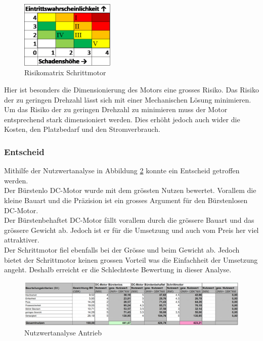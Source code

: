 \documentclass[../../main.tex]{subfiles}
\begin{document}
    \begin{figure}[H]
        \centering
        \includegraphics[width=0.4\textwidth]{Antr_Risiko_Schrittmotor.png}
        \caption {Risikomatrix Schrittmotor}
        \label{fig:antr_risikomatrix_schrittmotor}
    \end{figure}

    Hier ist besonders die Dimensionierung des Motors eine grosses Risiko. Das Risiko der zu geringen Drehzahl lässt sich mit einer Mechanischen Lösung  minimieren. Um das Risiko der zu geringen Drehzahl zu minimieren muss der Motor entsprechend stark dimensioniert werden. Dies erhöht jedoch auch wider die Kosten, den Platzbedarf und den Stromverbrauch.

    \subsubsection{Entscheid}
    Mithilfe der Nutzwertanalyse in Abbildung \ref{fig:antr_nutzwertanalyse} konnte ein Entscheid getroffen werden.\\
    Der Bürstenlo DC-Motor wurde mit dem grössten Nutzen bewertet. Vorallem die kleine Bauart und die Präzision ist ein grosses Argument für den Bürstenlosen DC-Motor.\\
    Der Bürstenbehaftet DC-Motor fällt vorallem durch die grössere Bauart und das grössere Gewicht ab. Jedoch ist er für die Umsetzung und auch vom Preis her viel attraktiver.\\
    Der Schrittmotor fiel ebenfalls bei der Grösse und beim Gewicht ab. Jedoch bietet der Schrittmotor keinen grossen Vorteil was die Einfachheit der Umsetzung angeht. Deshalb erreicht er die Schlechteste Bewertung in dieser Analyse.\\
        
    \begin{figure}[H]
        \centering
        \includegraphics[width=1.0\textwidth]{Antr_Nutzwertanalyse.png}
        \caption {Nutzwertanalyse Antrieb}
        \label{fig:antr_nutzwertanalyse}
    \end{figure}
\end{document}
